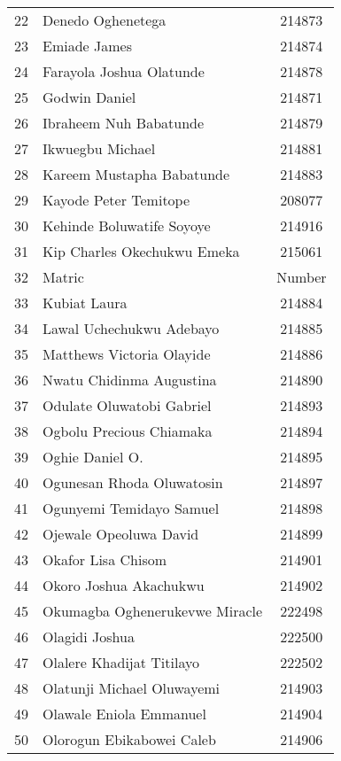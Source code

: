 \documentclass[a4paper]{article}
\begin{document}
\begin{center}
\begin{longtable} { c|l|c }
            22 & Denedo Oghenetega & 214873\\
            23 & Emiade James & 214874\\
            24 & Farayola Joshua Olatunde & 214878\\
            25 & Godwin Daniel & 214871\\
            26 & Ibraheem Nuh Babatunde & 214879\\
            27 & Ikwuegbu Michael & 214881\\
            28 & Kareem Mustapha Babatunde & 214883\\
            29 & Kayode Peter Temitope & 208077\\
            30 & Kehinde Boluwatife Soyoye & 214916\\
            31 & Kip Charles Okechukwu Emeka & 215061\\
            32 & Matric  & Number\\
            33 & Kubiat Laura & 214884\\
            34 & Lawal Uchechukwu Adebayo & 214885\\
            35 & Matthews Victoria Olayide & 214886\\
            36 & Nwatu Chidinma Augustina & 214890\\
            37 & Odulate Oluwatobi Gabriel & 214893\\
            38 & Ogbolu Precious Chiamaka & 214894\\
            39 & Oghie Daniel O. & 214895\\
            40 & Ogunesan Rhoda Oluwatosin & 214897\\
            41 & Ogunyemi Temidayo Samuel & 214898\\
            42 & Ojewale Opeoluwa David & 214899\\
            43 & Okafor Lisa Chisom & 214901\\
            44 & Okoro Joshua Akachukwu & 214902\\
            45 & Okumagba Oghenerukevwe Miracle & 222498\\
            46 & Olagidi Joshua & 222500\\
            47 & Olalere Khadijat Titilayo & 222502\\
            48 & Olatunji Michael Oluwayemi & 214903\\
            49 & Olawale Eniola Emmanuel & 214904\\
            50 & Olorogun Ebikabowei Caleb & 214906\\

\end{longtable}
\end{center}
\end{document}
